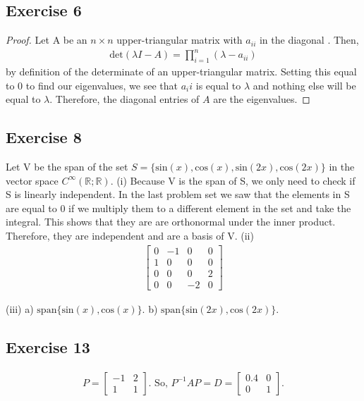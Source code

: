 \documentclass[11.5pt, letterpaper, bibtotoc,
    tablecaptionabove, figurecaptionabove]{article}
\begin{document}
\subsection*{Exercise 6 }
\begin{proof}
Let A be an $n \times n$ upper-triangular matrix with $a_{ii}$ in the diagonal .  Then,
\begin{align*}
	\text{det}(\lambda I - A) = \prod_{i=1}^{n} (\lambda - a_{ii})
\end{align*}
by definition of the determinate of an upper-triangular matrix.  Setting this equal to 0 to find  our eigenvalues, we see that $a_ii$ is equal to $\lambda$ and nothing else will be equal to $\lambda$.  Therefore, the diagonal entries of $A$ are the eigenvalues.
\end{proof}
	
	
\subsection*{Exercise 8 }
Let V be the span of the set $S = \{\text{sin}(x), \text{cos}(x), \text{sin}(2x), \text{cos}(2x) \}$ in the vector space $C^\infty (\mathbb{R}; \mathbb{R})$.
(i)
Because V is the span of S, we only need to check if S is linearly independent. In the last problem set we saw that the elements in S are equal to 0 if we multiply them to a different element in the set and take the integral.  This shows that they are are orthonormal under the inner product.  Therefore, they are independent and are a basis of V.
(ii)
\begin{align*}
    	\begin{bmatrix}
        		0 & -1 & 0 & 0\\
        		1 & 0 & 0 & 0\\
		0 & 0 & 0 & 2\\
		0 & 0 & -2 & 0
    \end{bmatrix}
\end{align*}

(iii)
  a) $\text{span}\{\text{sin}(x), \text{cos}(x)\}$.  b) $ \text{span}\{\text{sin}(2x), \text{cos}(2x)\}$.
  
  
\subsection*{Exercise 13}
\begin{align*}
	P = 
	\begin{bmatrix}
        		-1 & 2\\
        		1 & 1
    \end{bmatrix}
    \text{. So, } P^{-1} A P = D =
    	\begin{bmatrix}
        		0.4 & 0\\
        		0 & 1
    \end{bmatrix}.
\end{align*}
\end{document}
